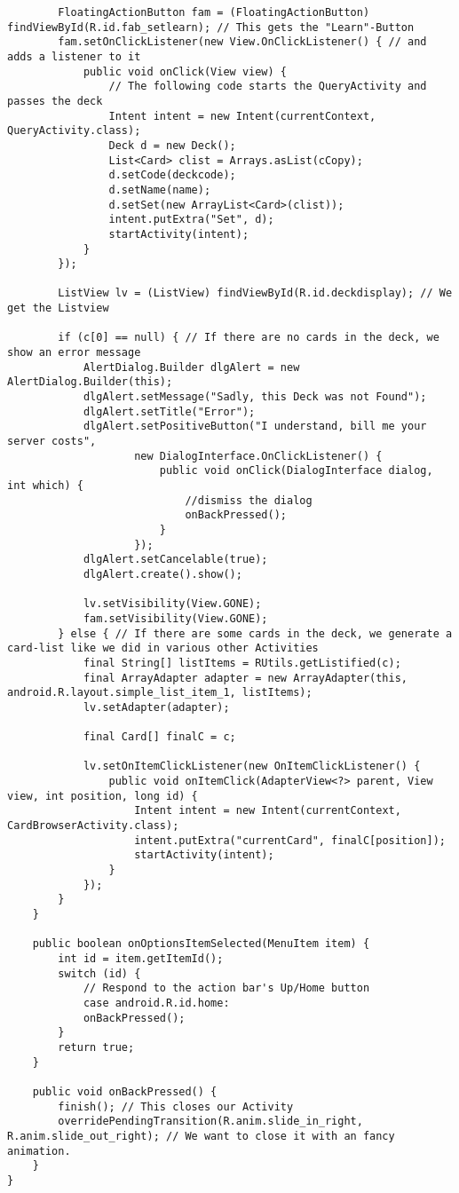 \begin{lstlisting}
        FloatingActionButton fam = (FloatingActionButton) findViewById(R.id.fab_setlearn); // This gets the "Learn"-Button
        fam.setOnClickListener(new View.OnClickListener() { // and adds a listener to it
            public void onClick(View view) {
                // The following code starts the QueryActivity and passes the deck
                Intent intent = new Intent(currentContext, QueryActivity.class);
                Deck d = new Deck();
                List<Card> clist = Arrays.asList(cCopy);
                d.setCode(deckcode);
                d.setName(name);
                d.setSet(new ArrayList<Card>(clist));
                intent.putExtra("Set", d);
                startActivity(intent);
            }
        });

        ListView lv = (ListView) findViewById(R.id.deckdisplay); // We get the Listview

        if (c[0] == null) { // If there are no cards in the deck, we show an error message
            AlertDialog.Builder dlgAlert = new AlertDialog.Builder(this);
            dlgAlert.setMessage("Sadly, this Deck was not Found");
            dlgAlert.setTitle("Error");
            dlgAlert.setPositiveButton("I understand, bill me your server costs",
                    new DialogInterface.OnClickListener() {
                        public void onClick(DialogInterface dialog, int which) {
                            //dismiss the dialog
                            onBackPressed();
                        }
                    });
            dlgAlert.setCancelable(true);
            dlgAlert.create().show();

            lv.setVisibility(View.GONE);
            fam.setVisibility(View.GONE);
        } else { // If there are some cards in the deck, we generate a card-list like we did in various other Activities
            final String[] listItems = RUtils.getListified(c);
            final ArrayAdapter adapter = new ArrayAdapter(this, android.R.layout.simple_list_item_1, listItems);
            lv.setAdapter(adapter);

            final Card[] finalC = c;

            lv.setOnItemClickListener(new OnItemClickListener() {
                public void onItemClick(AdapterView<?> parent, View view, int position, long id) {
                    Intent intent = new Intent(currentContext, CardBrowserActivity.class);
                    intent.putExtra("currentCard", finalC[position]);
                    startActivity(intent);
                }
            });
        }
    }

    public boolean onOptionsItemSelected(MenuItem item) {
        int id = item.getItemId();
        switch (id) {
            // Respond to the action bar's Up/Home button
            case android.R.id.home:
            onBackPressed();
        }
        return true;
    }

    public void onBackPressed() {
        finish(); // This closes our Activity
        overridePendingTransition(R.anim.slide_in_right, R.anim.slide_out_right); // We want to close it with an fancy animation.
    }
}
\end{lstlisting}
\newpage
